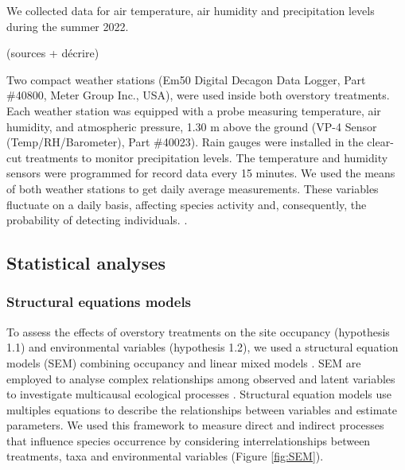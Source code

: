 We collected data for air temperature, air humidity and precipitation levels during the summer 2022.

(sources + décrire)

Two compact weather stations (Em50 Digital Decagon Data Logger, Part \#40800, Meter Group Inc., USA), were used inside both overstory treatments.
Each weather station was equipped with a probe measuring temperature, air humidity, and atmospheric pressure, 1.30 m above the ground (VP-4 Sensor (Temp/RH/Barometer), Part \#40023). 
Rain gauges were installed in the clear-cut treatments to monitor precipitation levels.
The temperature and humidity sensors were programmed for record data every 15 minutes. 
We used the means of both weather stations to get daily average measurements.
These variables fluctuate on a daily basis, affecting species activity and, consequently, the probability of detecting individuals. 
\citep{butterfieldCarabidLifeCycle1996,kotzeFortyYearsCarabid2011a,loveiEcologyBehaviorGround1996,odonnellPredictingVariationMicrohabitat2014a,spotilaRoleTemperatureWater1972}.

\subsection*{Statistical analyses}
\label{subsec:analyses}

\subsubsection{Structural equations models} 

To assess the effects of overstory treatments on the site occupancy (hypothesis 1.1) and environmental variables (hypothesis 1.2), we used a structural equation models (SEM) 
combining occupancy and linear mixed models \citep{graceSpecificationStructuralEquation2010,josephIntegratingOccupancyModels2016,mackenzieOccupancyEstimationModeling2006a}.
SEM are employed to analyse complex relationships among observed and latent variables to investigate multicausal ecological processes \citep{graceStructuralEquationModeling2008}.
Structural equation models use multiples equations to describe the relationships between variables and estimate parameters.
We used this framework to measure direct and indirect processes that influence species occurrence by considering interrelationships between treatments, taxa and environmental variables (Figure \ref*{fig:SEM}).

